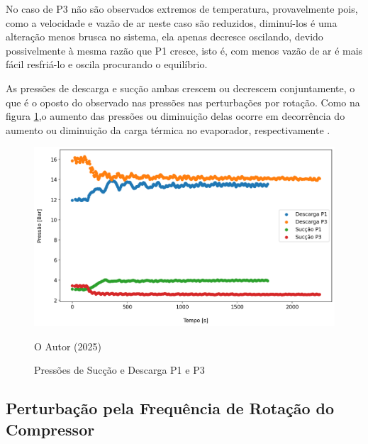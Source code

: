 No caso de P3 não são observados extremos de temperatura, provavelmente pois, como a velocidade e vazão de ar neste caso são reduzidos, diminuí-los é uma alteração menos brusca no sistema, ela apenas decresce oscilando, devido possivelmente à mesma razão que P1 cresce, isto é, com menos vazão de ar é mais fácil resfriá-lo e oscila procurando o equilíbrio.

As pressões de descarga e sucção ambas crescem ou decrescem conjuntamente, o que é o oposto do observado nas pressões nas perturbações por rotação. Como na figura \ref{fig:Pressões de Sucção e Descarga P1 e P3},o aumento das pressões ou diminuição delas ocorre em decorrência do aumento ou diminuição da carga térmica no evaporador, respectivamente \cite{EffectsOFRefrigeranteCompressorAirFlow}.

\begin{figure}[h]
    \centering
    \includegraphics[width=1\linewidth]{FigurasdoTexto/Pressões de Sucção e Descarga P1 e P3.png}
    \caption{Pressões de Sucção e Descarga P1 e P3}
    \label{fig:Pressões de Sucção e Descarga P1 e P3}
    {\footnotesize O Autor (2025)}
\end{figure}

\subsection{Perturbação pela Frequência de Rotação do Compressor}\label{subsec:PertubaçãoRotacaoCompressor}


